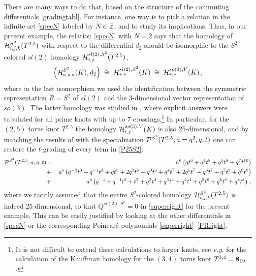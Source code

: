 \documentclass[hyper,letterpaper]{JHEP3}
\newcommand{\be}{\begin{equation}}
\newcommand{\ee}{\end{equation}}
\newcommand{\Z}{{\mathbb Z}}
\newcommand{\cH}{{\cal H }}
\renewcommand{\P}{{\cal P}}
\begin{document}
There are many ways to do that, based on the structure of the commuting differentials \eqref{gradingtabl}.
For instance, one way is to pick a relation in the infinite set \eqref{specN} labeled by $N \in \Z$, and to study its implications.
Thus, in our present example, the relation \eqref{specN} with $N=2$ says that the homology of $\cH^{S^2}_{i,j,k} (T^{2,5})$
with respect to the differential $d_2$ should be isomorphic to the $S^2$ colored $sl(2)$ homology $\cH^{sl(2),S^2}_{i,j} (T^{2,5})$,
\be
\left( \cH^{S^2}_{*,*,*} (K) , d_2 \right)
\; \cong \;
\cH^{sl(2), S^2}_{*,*} (K)
\; \cong \;
\cH^{so(3), V}_{*,*} (K) \,,
\ee
where in the last isomorphism we used the identification between the symmetric representation $R = S^2$ of $sl(2)$
and the 3-dimensional vector representation of $so(3)$. The latter homology was studied in \cite{GWalcher},
where explicit answers were tabulated for all prime knots with up to 7 crossings.\footnote{It is not difficult to
extend these calculations to larger knots,
see {\it e.g.} \cite{GS} for the calculation of the Kauffman homology for the $(3,4)$ torus knot $T^{3,4} = {\bf 8}_{19}$.}
In particular, for the $(2,5)$ torus knot $T^{2,5}$ the homology $\cH^{so(3), V}_{i,j} (K)$ is also 25-dimensional,
and by matching the results of \cite{GWalcher} with the specialization $\P^{S^2} (T^{2,5}; a=q^2,q,t)$
one can restore the $t$-grading of every term in \eqref{P25S2}:
\begin{eqnarray}
\P^{S^2} (T^{2,5}; a,q,t)
&=& a^6 \left( q t^6 + q^4 t^8 + q^5 t^8 + q^7 t^{10} \right) \label{superP25S2} \\
&+& a^5 \left( q^{-2} t^3 + q^{-1} t^3 + q t^5 + 2 q^2 t^5 + q^3 t^5 + q^4 t^7 + 2 q^5 t^7 + q^6 t^7 + q^7 t^9 + q^8 t^9 \right) \nonumber \\
&+& a^4 \left( q^{-4} + q^{-1} t^2 + t^2 + q^2 t^4 + q^3 t^4 + q^4 t^4 + q^5 t^6 + q^6 t^6 + q^8 t^8 \right) \, , \nonumber
\end{eqnarray}
where we tacitly assumed that the entire $S^2$-colored homology $\cH^{S^2}_{i,j,k} (T^{2,5})$
is indeed 25-dimensional, so that $Q^{sl(2),S^2} = 0$ in \eqref{superright} for the present example.
This can be easily justified by looking at the other differentials in \eqref{specN}
or the corresponding Poincar\'e polynomials \eqref{superright}--\eqref{PRright}.
\end{document}
